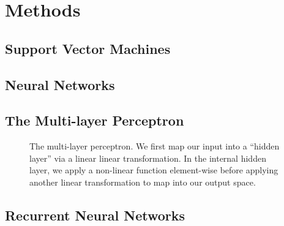 \section{Methods}

\subsection{Support Vector Machines}

\subsection{Neural Networks}

\subsection{The Multi-layer Perceptron}

\begin{figure}
	\centering
	\caption{The multi-layer perceptron.  We first map our input into a ``hidden layer'' via a linear linear transformation. In the internal hidden layer, we apply a non-linear function element-wise before applying another linear transformation to map into our output space.}
\end{figure}

\subsection{Recurrent Neural Networks}

